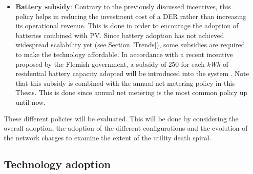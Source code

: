 \begin{itemize}
\item \textbf{Battery subsidy}: Contrary to the previously discussed incentives, this policy helps in reducing the investment cost of a DER rather than increasing its operational revenue. This is done in order to encourage the adoption of batteries combined with PV. Since battery adoption has not achieved widespread scalability yet (see Section \ref{Trends}), some subsidies are required to make the technology affordable. In accordance with a recent incentive proposed by the Flemish government, a subsidy of 250 \EUR{} for each \textit{kWh} of residential battery capacity adopted will be introduced into the system \cite{subsidy}. Note that this subsidy is combined with the annual net metering policy in this Thesis. This is done since annual net metering is the most common policy up until now. 
\end{itemize}
These different policies will be evaluated. This will be done by considering the overall adoption, the adoption of the different configurations and the evolution of the network charges to examine the extent of the utility death spiral. 
\subsection{Technology adoption}
